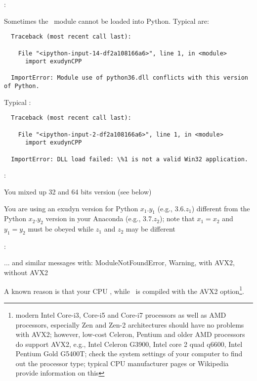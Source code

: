 \noindent {}:
\bi
  \item Sometimes the \codeName\ module cannot be loaded into Python. Typical  are: \vspace{1pt}\\
\plainlststyle
\begin{lstlisting}
  Traceback (most recent call last):

    File "<ipython-input-14-df2a108166a6>", line 1, in <module>
      import exudynCPP

  ImportError: Module use of python36.dll conflicts with this version of Python.
\end{lstlisting}
%
Typical :\vspace{1pt}\\
\begin{lstlisting}
  Traceback (most recent call last):
  
    File "<ipython-input-2-df2a108166a6>", line 1, in <module>
      import exudynCPP

  ImportError: DLL load failed: \%1 is not a valid Win32 application.
\end{lstlisting}
%
:
\bi
\item[$\ra$] You mixed up 32 and 64 bits version (see below) 
\item[$\ra$] You are using an exudyn version for Python $x_1.y_1$ (e.g., 3.6.$z_1$) different from the Python $x_2.y_2$ version in your Anaconda (e.g., 3.7.$z_2$); note that $x_1=x_2$ and $y_1=y_2$ must be obeyed while $z_1$ and $z_2$ may be different
\ei
%
\item {}:
\bi
\item[$\ra$] ... and similar messages with: ModuleNotFoundError, Warning, with AVX2, without AVX2
\item[$\ra$] A known reason is that your CPU , while \codeName\ is compiled with the AVX2 option\footnote{modern Intel Core-i3, Core-i5 and Core-i7 processors as well as AMD processors, especially Zen and Zen-2 architectures should have no problems with AVX2; however, low-cost Celeron, Pentium and older AMD processors do  support AVX2, e.g.,  Intel Celeron G3900, Intel core 2 quad q6600, Intel Pentium Gold G5400T; check the system settings of your computer to find out the processor type; typical CPU manufacturer pages or Wikipedia provide information on this}.
